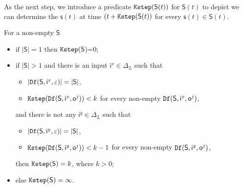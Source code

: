 As the next step, we introduce a predicate ${\tt Kstep}(\mathsf{S}(t))$ for $\mathsf{S}(t)$ to depict we can determine the $\mathsf{s}(t)$ at time $(t+{\tt Kstep}(\mathsf{S}(t))$ for every $\mathsf{s}(t)\in \mathsf{S}(t)$. 
\begin{definition}[$\Ks(\mathsf{S})$] 
For a non-empty $\mathsf{S}$
 \begin{itemize}
 \item   if $|\mathsf{S}|=1$ then ${\tt Kstep}(\mathsf{S}$)=0;
 \item  if $|\mathsf{S}|>1$ and there is an input $\mathsf{i}^{x} \in \Delta_L$ such that %
 \begin{itemize}
 \item  $|{\tt Df}(\mathsf{S},\mathsf{i}^{x},\varepsilon)|=|\mathsf{S}|$,
 \item  ${\tt Kstep}({\tt Df}(\mathsf{S},\mathsf{i}^{x},\mathsf{o}^{j}))< k$ for every non-empty ${\tt Df}(\mathsf{S},\mathsf{i}^{x},\mathsf{o}^{j})$,
 \end{itemize} 
 and there is not any $\mathsf{i}^{y} \in \Delta_L$ such that
  \begin{itemize}
 \item  $|{\tt Df}(\mathsf{S},\mathsf{i}^{y},\varepsilon)|=|\mathsf{S}|$,
 \item  ${\tt Kstep}({\tt Df}(\mathsf{S},\mathsf{i}^{y},\mathsf{o}^{j}))< k-1$ for every non-empty ${\tt Df}(\mathsf{S},\mathsf{i}^{y},\mathsf{o}^{j})$,
 \end{itemize} 
then ${\tt Kstep}(\mathsf{S})=k$, where $k >0$;%
 \item else ${\tt Kstep}(\mathsf{S})=\infty$.
 \end{itemize}
\end{definition}

